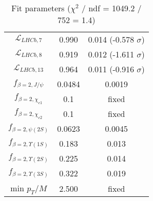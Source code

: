 \begin{table}[h!]
\begin{tabular}{c|c|c}
$\mathcal L_{LHCb,7}$ & 0.990 & 0.014 (-0.578 $\sigma$) \\
$\mathcal L_{LHCb,8}$ & 0.919 & 0.012 (-1.611 $\sigma$) \\
$\mathcal L_{LHCb,13}$ & 0.964 & 0.011 (-0.916 $\sigma$) \\
$f_{\beta=2,J/\psi}$ & 0.0484 & 0.0019 \\
$f_{\beta=2,\chi_{c1}}$ & 0.1 & fixed \\
$f_{\beta=2,\chi_{c2}}$ & 0.1 & fixed \\
$f_{\beta=2,\psi(2S)}$ & 0.0623 & 0.0045 \\
$f_{\beta=2,\Upsilon(1S)}$ & 0.183 & 0.013 \\
$f_{\beta=2,\Upsilon(2S)}$ & 0.225 & 0.014 \\
$f_{\beta=2,\Upsilon(3S)}$ & 0.322 & 0.019 \\
min $p_T/M$ & 2.500 & fixed \\
\end{tabular}
\caption{Fit parameters ($\chi^2$ / ndf = 1049.2 / 752 = 1.4)}
\end{table}
